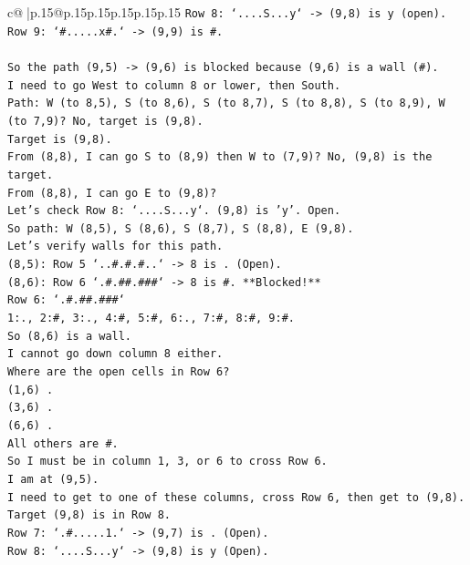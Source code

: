 \documentclass{article}
\begin{document}
{\begin{supertabular}{c@{$\;$}|p{.15\linewidth}@{}p{.15\linewidth}p{.15\linewidth}p{.15\linewidth}p{.15\linewidth}p{.15\linewidth}}
{{{\texttt{Row 8: `....S...y` {-}> (9,8) is y (open).} \\
\texttt{Row 9: `\#.....x\#.` {-}> (9,9) is \#.} \\
\\ 
\texttt{So the path (9,5) {-}> (9,6) is blocked because (9,6) is a wall (\#).} \\
\texttt{I need to go West to column 8 or lower, then South.} \\
\texttt{Path: W (to 8,5), S (to 8,6), S (to 8,7), S (to 8,8), S (to 8,9), W (to 7,9)? No, target is (9,8).} \\
\texttt{Target is (9,8).} \\
\texttt{From (8,8), I can go S to (8,9) then W to (7,9)? No, (9,8) is the target.} \\
\texttt{From (8,8), I can go E to (9,8)?} \\
\texttt{Let's check Row 8: `....S...y`. (9,8) is 'y'. Open.} \\
\texttt{So path: W (8,5), S (8,6), S (8,7), S (8,8), E (9,8).} \\
\texttt{Let's verify walls for this path.} \\
\texttt{(8,5): Row 5 `..\#.\#.\#..` {-}> 8 is . (Open).} \\
\texttt{(8,6): Row 6 `.\#.\#\#.\#\#\#` {-}> 8 is \#. **Blocked!**} \\
\texttt{Row 6: `.\#.\#\#.\#\#\#`} \\
\texttt{1:., 2:\#, 3:., 4:\#, 5:\#, 6:., 7:\#, 8:\#, 9:\#.} \\
\texttt{So (8,6) is a wall.} \\
\texttt{I cannot go down column 8 either.} \\
\texttt{Where are the open cells in Row 6?} \\
\texttt{(1,6) .} \\
\texttt{(3,6) .} \\
\texttt{(6,6) .} \\
\texttt{All others are \#.} \\
\texttt{So I must be in column 1, 3, or 6 to cross Row 6.} \\
\texttt{I am at (9,5).} \\
\texttt{I need to get to one of these columns, cross Row 6, then get to (9,8).} \\
\texttt{Target (9,8) is in Row 8.} \\
\texttt{Row 7: `.\#.....1.` {-}> (9,7) is . (Open).} \\
\texttt{Row 8: `....S...y` {-}> (9,8) is y (Open).} \\
}}}
\end{supertabular}}
\end{document}

